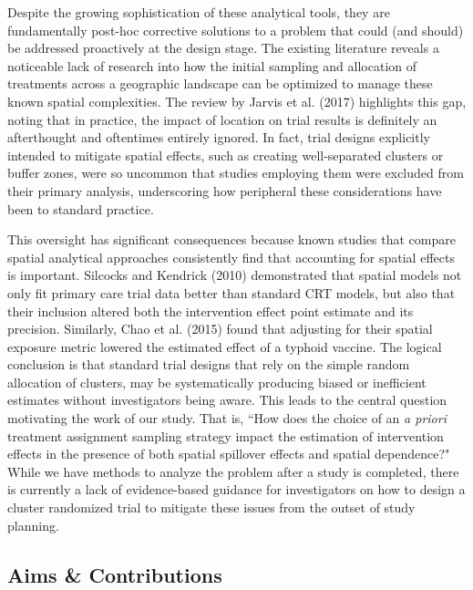 \documentclass{article}[11pt]
\begin{document}
Despite the growing sophistication of these analytical tools, they are fundamentally post-hoc corrective solutions to a problem that could (and should) be addressed proactively at the design stage. The existing literature reveals a noticeable lack of research into how the initial sampling and allocation of treatments across a geographic landscape can be optimized to manage these known spatial complexities. The review by Jarvis et al. (2017) highlights this gap, noting that in practice, the impact of location on trial results is definitely an afterthought and oftentimes entirely ignored\cite{jarvis_spatial_2017}. In fact, trial designs explicitly intended to mitigate spatial effects, such as creating well-separated clusters or buffer zones, were so uncommon that studies employing them were excluded from their primary analysis, underscoring how peripheral these considerations have been to standard practice\cite{jarvis_spatial_2017}. 

This oversight has significant consequences because known studies that compare spatial analytical approaches consistently find that accounting for spatial effects is important. Silcocks and Kendrick (2010) demonstrated that spatial models not only fit primary care trial data better than standard CRT models, but also that their inclusion altered both the intervention effect point estimate and its precision\cite{silcocks_spatial_2010}. Similarly, Chao et al. (2015) found that adjusting for their spatial exposure metric lowered the estimated effect of a typhoid vaccine\cite{chao_contribution_2015}. The logical conclusion is that standard trial designs that rely on the simple random allocation of clusters, may be systematically producing biased or inefficient estimates without investigators being aware. This leads to the central question motivating the work of our study. That is, ``How does the choice of an \textit{a priori} treatment assignment sampling strategy impact the estimation of intervention effects in the presence of both spatial spillover effects and spatial dependence?" While we have methods to analyze the problem after a study is completed, there is currently a lack of evidence-based guidance for investigators on how to design a cluster randomized trial to mitigate these issues from the outset of study planning.

\subsection{Aims \& Contributions}
\end{document}
